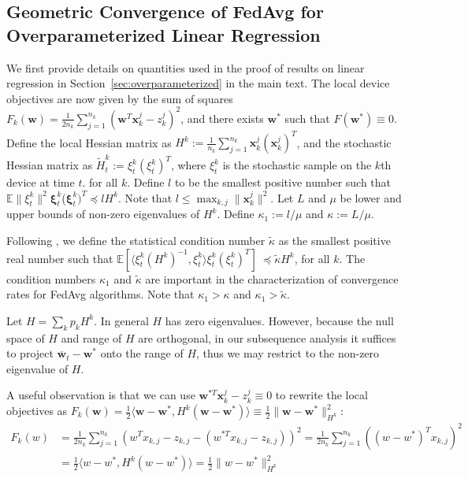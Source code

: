 \subsection{Geometric Convergence of FedAvg for Overparameterized Linear Regression}

We first provide details on quantities used in the proof of results on linear regression in Section~\ref{sec:overparameterized} in the main text. The local device objectives are now given by the sum of squares {\small$F_{k}(\mathbf{w})=\frac{1}{2n_{k}}\sum_{j=1}^{n_{k}}(\mathbf{w}^{T}\mathbf{x}_{k}^{j}-z_{k}^{j})^{2}$},
and there exists $\mathbf{w}^{\ast}$ such that $F(\mathbf{w}^{\ast})\equiv0$. 
Define the local Hessian matrix as $H^{k}:=\frac{1}{n_{k}}\sum_{j=1}^{n_{k}}\mathbf{x}_{k}^{j}(\mathbf{x}_{k}^{j})^{T}$, and the stochastic Hessian matrix as $\tilde{H}_{t}^{k}:=\xi_{t}^{k}(\xi_{t}^{k})^{T}$, where $\xi_{t}^{k}$ is the stochastic sample on the $k$th device at
time $t$. 
for all $k$. Define $l$ to be the smallest positive number such that $\mathbb{E}\|\xi_{t}^{k}\|^{2}$$\mathbf{\xi}_{t}^{k}$($\mathbf{\xi}_{t}^{k})^{T}\preceq lH^{k}$. Note that $l\leq\max_{k,j}\|\mathbf{x}_{k}^{j}\|^{2}$.
Let $L$ and $\mu$ be lower and upper bounds of non-zero eigenvalues
of $H^{k}$. Define $\kappa_{1}:=l/\mu$ and $\kappa:=L/\mu$. 

Following
\cite{liu2018accelerating,jain2017accelerating}, we define the statistical
condition number $\tilde{\kappa}$ as the smallest positive real number
such that $\mathbb{E}\left[\langle\xi_{t}^{k}(H^{k})^{-1},\xi_{t}^{k}\rangle\xi_{t}^{k}(\xi_{t}^{k})^{T}\right] \  \preceq\tilde{\kappa}H^{k}$, for all $k$. 
The condition numbers $\kappa_{1}$ and $\tilde{\kappa}$
are important in the characterization of convergence rates for FedAvg
algorithms. Note that $\kappa_{1}>\kappa$ and $\kappa_{1}>\tilde{\kappa}$.


Let $H=\sum_{k}p_kH^k$. In general $H$ has zero eigenvalues. However, because the null space
of $H$ and range of $H$ are orthogonal, in our subsequence analysis
it suffices to project $\overline{\mathbf{w}}_{t}-\mathbf{w}^{\ast}$
onto the range of $H$, thus we may restrict to the non-zero eigenvalue
of $H$. 

A useful observation is that we can use $\mathbf{w}^{\ast T}\mathbf{x}_{k}^{j}-z_{k}^{j}\equiv0$
to rewrite the local objectives as $F_{k}(\mathbf{w})=\frac{1}{2}\langle\mathbf{w}-\mathbf{w}^{\ast},H^{k}(\mathbf{w}-\mathbf{w}^{\ast})\rangle\equiv\frac{1}{2}\|\mathbf{w}-\mathbf{w}^{\ast}\|_{H^{k}}^{2}$:
\begin{align*}
F_{k}(w) & =\frac{1}{2n_{k}}\sum_{j=1}^{n_{k}}(w^{T}x_{k,j}-z_{k,j}-(w^{\ast T}x_{k,j}-z_{k,j}))^{2}=\frac{1}{2n_{k}}\sum_{j=1}^{n_{k}}((w-w^{\ast})^{T}x_{k,j})^{2}\\
& =\frac{1}{2}\langle w-w^{\ast},H^{k}(w-w^{\ast})\rangle=\frac{1}{2}\|w-w^{\ast}\|_{H^{k}}^{2}
\end{align*}

